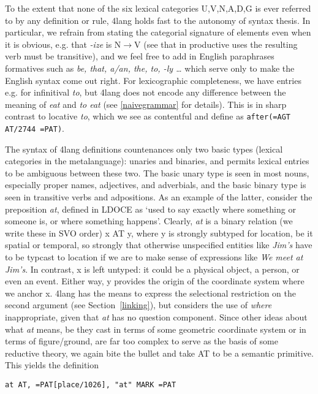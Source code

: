 \documentclass[11pt,bookmarks,bookmarksnumbered,naturalnames,plainpages=false,pdftex,colorlinks=true,urlcolor=blue,bookmarksdepth=subsection,plainpages=false]{paper}
\begin{document}
To the extent that none of the six lexical categories U,V,N,A,D,G is ever
referred to by any definition or rule, 4lang holds fast to the autonomy of
syntax thesis. In particular, we refrain from stating the categorial signature
of elements even when it is obvious, e.g. that {\it -ize} is N$\rightarrow$V
(see \cite{Lieber:1992} that in productive uses the resulting verb must be
transitive), and we feel free to add in English paraphrases formatives such as
{\it be, that, a/an, the, to, -ly \ldots} which serve only to make the English
syntax come out right. For lexicographic completeness, we have entries
e.g. for infinitival {\it to}, but 4lang does not encode any difference
between the meaning of {\it eat} and {\it to eat} (see \ref{naivegrammar} for
details). This is in sharp contrast to locative {\it to}, which we see as
contentful and define as {\tt after(=AGT AT/2744 =PAT)}.

The syntax of 4lang definitions countenances only two basic types (lexical
categories in the metalanguage): unaries and binaries, and permits lexical
entries to be ambiguous between these two.  The basic unary type is seen in
most nouns, especially proper names, adjectives, and adverbials, and the basic
binary type is seen in transitive verbs and adpositions.  As an example of the
latter, consider the preposition {\it at}, defined in LDOCE as `used to say
exactly where something or someone is, or where something happens'. Clearly,
{\it at} is a binary relation (we write these in SVO order) x AT y, where y is
strongly subtyped for location, be it spatial or temporal, so strongly that
otherwise unspecified entities like {\it Jim's} have to be typcast to location
if we are to make sense of expressions like {\it We meet at Jim's}. In
contrast, x is left untyped: it could be a physical object, a person, or even
an event. Either way, y provides the origin of the coordinate system where we
anchor x. 4lang has the means to express the selectional restriction on the
second argument (see Section~\ref{linking}), but considers the use of {\it
  where} inappropriate, given that {\it at} has no question component. %
Since other ideas about what
{\it at} means, be they cast in terms of some geometric coordinate system or
in terms of figure/ground, are far too complex to serve as the basis of some
reductive theory, we again bite the bullet and take AT to be a semantic
primitive. This yields the definition

\begin{verbatim}
at AT, =PAT[place/1026], "at" MARK =PAT
\end{verbatim}
\end{document}
